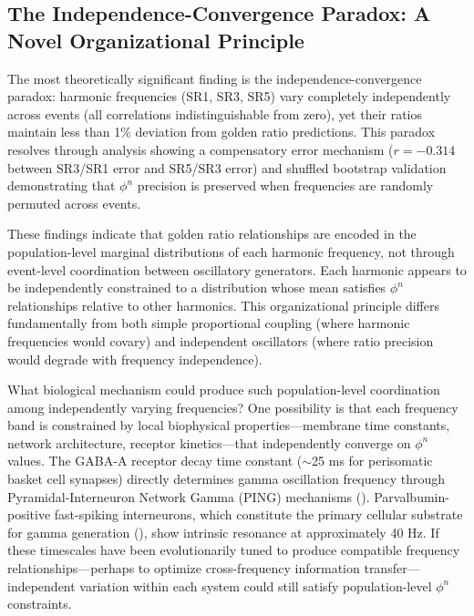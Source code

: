 \documentclass[11pt,a4paper]{article}
\begin{document}
\subsection{The Independence-Convergence Paradox: A Novel Organizational Principle}

The most theoretically significant finding is the independence-convergence paradox: harmonic frequencies (SR1, SR3, SR5) vary completely independently across events (all correlations indistinguishable from zero), yet their ratios maintain less than 1\% deviation from golden ratio predictions. This paradox resolves through analysis showing a compensatory error mechanism ($r = -0.314$ between SR3/SR1 error and SR5/SR3 error) and shuffled bootstrap validation demonstrating that $\phi^n$ precision is preserved when frequencies are randomly permuted across events.

These findings indicate that golden ratio relationships are encoded in the population-level marginal distributions of each harmonic frequency, not through event-level coordination between oscillatory generators. Each harmonic appears to be independently constrained to a distribution whose mean satisfies $\phi^n$ relationships relative to other harmonics. This organizational principle differs fundamentally from both simple proportional coupling (where harmonic frequencies would covary) and independent oscillators (where ratio precision would degrade with frequency independence).

What biological mechanism could produce such population-level coordination among independently varying frequencies? One possibility is that each frequency band is constrained by local biophysical properties—membrane time constants, network architecture, receptor kinetics—that independently converge on $\phi^n$ values. The GABA-A receptor decay time constant ($\sim$25 ms for perisomatic basket cell synapses) directly determines gamma oscillation frequency through Pyramidal-Interneuron Network Gamma (PING) mechanisms (\cite{bartos2007synaptic, wang2010gamma, brunel2003fast}). Parvalbumin-positive fast-spiking interneurons, which constitute the primary cellular substrate for gamma generation (\cite{cardin2009driving, sohal2009parvalbumin}), show intrinsic resonance at approximately 40 Hz. If these timescales have been evolutionarily tuned to produce compatible frequency relationships—perhaps to optimize cross-frequency information transfer—independent variation within each system could still satisfy population-level $\phi^n$ constraints.
\end{document}
